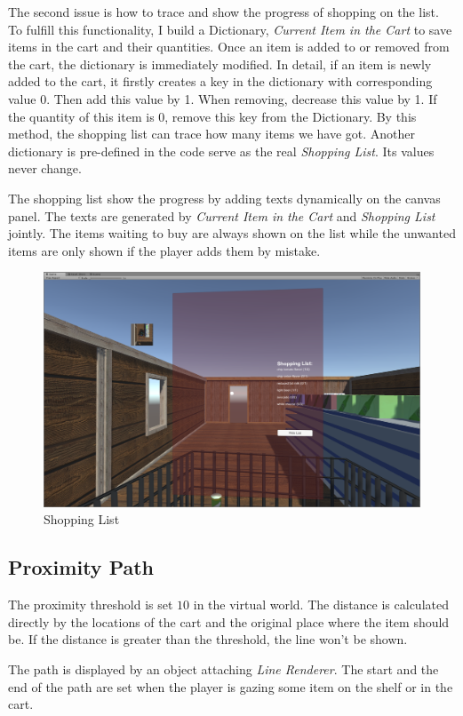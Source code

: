 \documentclass[11pt]{article}
\begin{document}
	The second issue is how to trace and show the progress of shopping on the list. To fulfill this functionality, I build a Dictionary, \textit{Current Item in the Cart} to save items in the cart and their quantities. Once an item is added to or removed from the cart, the dictionary is immediately modified. In detail, if an item is newly added to the cart, it firstly creates a key in the dictionary with corresponding value 0. Then add this value by 1. When removing, decrease this value by 1. If the quantity of this item is 0, remove this key from the Dictionary. By this method, the shopping list can trace how many items we have got. Another dictionary is pre-defined in the code serve as the real \textit{Shopping List}. Its values never change. 
	
	The shopping list show the progress by adding texts dynamically on the canvas panel. The texts are generated by \textit{Current Item in the Cart} and \textit{Shopping List} jointly. The items waiting to buy are always shown on the list while the unwanted items are only shown if the player adds them by mistake.
	\begin{figure}[htbp]
		\centering
		\includegraphics[width=.80\textwidth]{fig/shoppinglist.png}
		\caption{Shopping List}
	\end{figure}
	
	\subsection{Proximity Path}
	The proximity threshold is set $10$ in the virtual world. The distance is calculated directly by the locations of the cart and the original place where the item should be. If the distance is greater than the threshold, the line won't be shown.
	
	The path is displayed by an object attaching \textit{Line Renderer}. The start and the end of the path are set when the player is gazing some item on the shelf or in the cart. 
	
\end{document}
